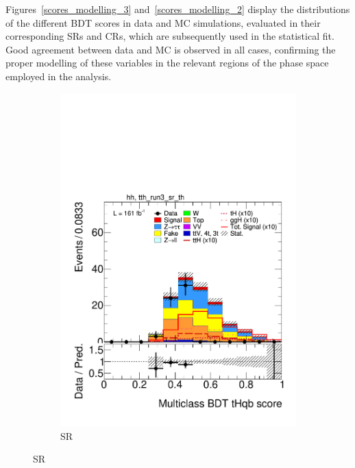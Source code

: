 Figures~\ref{scores_modelling_3} and~\ref{scores_modelling_2} display the distributions of the different BDT scores in data and MC simulations, evaluated in their corresponding SRs and CRs, which are subsequently used in the statistical fit. Good agreement between data and MC is observed in all cases, confirming the proper modelling of these variables in the relevant regions of the phase space employed in the analysis.

\begin{figure}[htbp]
  \centering
  \begin{subfigure}[b]{0.49\textwidth}
    \centering
    \includegraphics[width=\textwidth]{images/plots_modelling_run2_run3_variables/run_3_tth/plot_tth_th_multiclass_th_hh_tth_run3_sr_th_22_23_24.pdf}
    \caption{\thqb SR}


\end{subfigure}
\end{figure}
